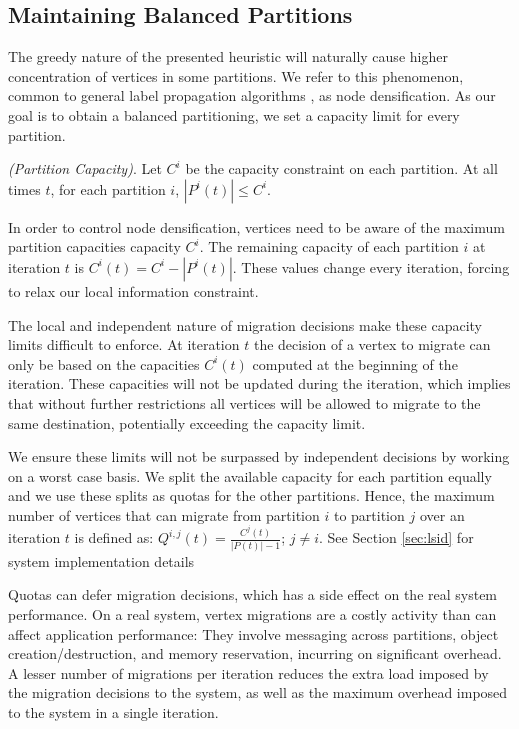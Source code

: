 \documentclass{sig-alternate-10pt}
\newenvironment{definition}[1][Definition]{\begin{trivlist}
\item[\hskip \labelsep {\bfseries #1}]}{\end{trivlist}}
\begin{document}
\subsection{Maintaining Balanced Partitions}

The greedy nature of the presented heuristic will naturally cause higher concentration of vertices in some partitions. We refer to this phenomenon, common to general label propagation algorithms \cite{raghavan2007}, as node densification. As our goal is to obtain a balanced partitioning, we set a capacity limit  for every partition.
\begin{definition} \emph{(Partition Capacity)}.
Let $C^{i}$ be the capacity constraint on each partition. At all times $t$, for each partition $i$, $|P^{i}(t)| \leq C^{i}$. 
\end{definition}

In order to control node densification, vertices need to be aware of the maximum partition capacities capacity ${C^{i}}$. The remaining capacity of each partition $i$ at iteration $t$ is $C^i(t) = C^{i} -|P^i(t)|$. These values change every iteration, forcing to relax our local information constraint.
 
The local and independent nature of migration decisions make these capacity limits difficult to enforce. At iteration $t$ the decision of a vertex to migrate can only be based on the capacities $C^i(t)$ computed at the beginning of the iteration. These capacities will not be updated during the iteration, which implies that without further restrictions all vertices will be allowed to migrate to the same destination, potentially exceeding the capacity limit. 

We ensure these limits will not be surpassed by independent  decisions by working on a worst case basis. We split the available capacity for each partition equally and we use these splits as quotas for the other partitions. Hence, the maximum number of vertices that can migrate from partition $i$ to partition $j$ over an iteration $t$ is defined as: $Q^{i,j}(t)=\frac{C^j(t)}{|P(t)|-1}$; $j \neq i$. See Section \ref{sec:lsid} for system implementation details  

Quotas can defer migration decisions, which has a side effect on the real system performance. On a real system, vertex migrations are a costly activity than can affect application performance: They involve messaging across partitions, object creation/destruction, and memory reservation, incurring on significant overhead. A lesser number of migrations per iteration reduces the extra load imposed by the migration decisions to the system, as well as the maximum overhead imposed to the system in a single iteration.
\end{document}
